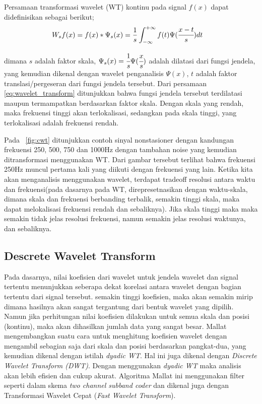 Persamaan transformasi wavelet (WT) kontinu pada signal $f(x)$ dapat
didefinisikan sebagai berikut;
\begin{align}
\label{eq:wavelet_transform}
	W_{s}f(x) &= f(x) * \Psi_{s}(x) = \frac{1}{s}\int^{+\infty}_{-\infty}f(t)
	\Psi(\cfrac{x - t}{s})dt
\end{align}

\noindent dimana $s$ adalah faktor skala,  $\Psi_{s}(x) =
\cfrac{1}{s}\Psi(\cfrac{x}{s})$ adalah dilatasi dari fungsi jendela, yang
kemudian dikenal dengan wavelet penganalisis $\Psi(x)$, $t$ adalah  faktor
translasi/pergeseran dari fungsi jendela tersebut. Dari persamaan
\ref{eq:wavelet_transform} ditunjukkan bahwa fungsi jendela tersebut terdilatasi
maupun termampatkan berdasarkan faktor skala. Dengan skala yang rendah, maka
frekuensi tinggi akan terlokalisasi, sedangkan pada skala tinggi, yang
terlokalisasi adalah frekuensi rendah. 


Pada \pic~\ref{fig:cwt} ditunjukkan contoh sinyal nonstasioner dengan kandungan
frekuensi 250, 500, 750 dan 1000Hz dengan tambahan noise yang kemudian
ditransformasi menggunakan WT. Dari gambar tersebut terlihat bahwa frekuensi
250Hz muncul pertama kali yang diikuti dengan frekuensi yang lain. Ketika kita
akan menganalisis menggunakan wavelet, terdapat tradeoff resolusi antara waktu
dan frekuensi(pada dasarnya pada WT, direpresetnasikan dengan waktu-skala,
dimana skala dan frekuensi berbanding terbalik, semakin tinggi skala, maka
dapat melokalisasi frekuensi rendah dan sebaliknya). Jika skala tinggi
maka maka semakin tidak jelas resolusi frekuensi, namun
semakin jelas resolusi waktunya, dan sebaliknya.

\subsection{Descrete Wavelet Transform}
Pada dasarnya, nilai koefisien dari wavelet untuk jendela wavelet dan
signal tertentu menunjukkan seberapa dekat korelasi antara wavelet 
dengan bagian tertentu dari signal tersebut. semakin tinggi koefisien, maka akan
semakin mirip dimana hasilnya akan sangat tergantung dari bentuk wavelet yang
dipilih\cite{wavelet:matlab}. Namun jika perhitungan nilai koefisien dilakukan
untuk semua skala dan posisi (kontinu), maka akan dihasilkan jumlah data yang
sangat besar. Mallat \cite{Mallat:1989} mengembangkan suatu cara untuk
menghitung koefisien wavelet dengan mengambil sebagian saja dari skala dan
posisi berdasarkan pangkat-dua, yang kemudian dikenal dengan istilah
\emph{dyadic WT}. Hal ini juga dikenal dengan \emph{Discrete Wavelet
Transform (DWT)}. Dengan menggunakan \emph{dyadic WT} maka analisis akan lebih
efisien dan cukup  akurat. Algoritma Mallat ini menggunakan filter seperti dalam
skema \emph{two channel subband coder} dan dikenal juga dengan Transformasi
Wavelet Cepat (\emph{Fast Wavelet Transform}).

